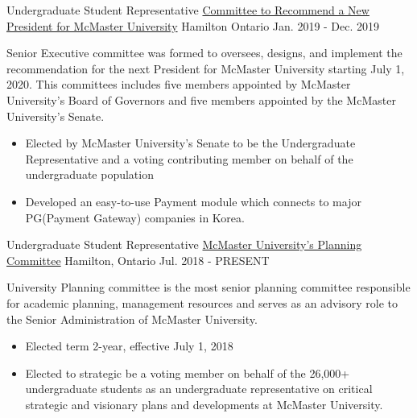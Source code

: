 \begin{cventries}
  \cventry
   {Undergraduate Student Representative} %
     {\href{ https://secretariat.mcmaster.ca/app/uploads/2019/03/Membership-List-1.pdf}{Committee to Recommend a New President for McMaster University}} %
    {Hamilton Ontario} %
    {Jan. 2019 - Dec. 2019} %
     {\renewcommand{\labelitemii}{\bullet}
      \begin{cvitems}%
        \item[] {Senior Executive committee was formed to oversees, designs, and implement the recommendation for the next President for McMaster University starting July 1, 2020. This committees includes five members appointed by McMaster University's Board of Governors and five members appointed by the McMaster University's Senate.}
        \begin{itemize} 
        \item {Elected by McMaster University's Senate to be the Undergraduate Representative and a voting contributing member on behalf of the undergraduate population}
        \item {Developed an easy-to-use Payment module which connects to major PG(Payment Gateway) companies in Korea.}
        \end{itemize}
      \end{cvitems}
    }
\vspace{0.25cm}
  \cventry
   {Undergraduate Student Representative} %
     {\href{https://secretariat.mcmaster.ca/app/uploads/2019/01/2018-2019-UPC-membership-1.pdf}{McMaster University's Planning Committee}} %
    {Hamilton, Ontario} %
    {Jul. 2018 - PRESENT} %
     {\renewcommand{\labelitemii}{\bullet}
      \begin{cvitems}%
        \item[] {University Planning committee is the most senior planning committee responsible for academic planning, management resources and serves as an advisory role to the Senior Administration of McMaster University.}
            \begin{itemize} 
                \item {Elected term 2-year, effective July 1, 2018}
                \item {Elected to strategic be a voting member on behalf of the 26,000+ undergraduate students as an undergraduate representative on critical strategic and visionary plans and developments at McMaster University.}

\end{itemize}
\end{cvitems}}
\end{cventries}
